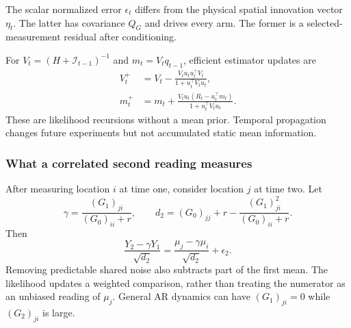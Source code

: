 The scalar normalized error $\epsilon_t$ differs from the physical spatial innovation vector $\eta_t$. The latter has covariance $Q_G$ and drives every arm. The former is a selected-measurement residual after conditioning.

For $V_t=(H+\mathcal I_{t-1})^{-1}$ and $m_t=V_tq_{t-1}$, efficient estimator updates are
\begin{align}
V_t^+&=V_t-\frac{V_tu_tu_t^\top V_t}{1+u_t^\top V_tu_t},\nonumber\\
m_t^+&=m_t+\frac{V_tu_t(R_t-u_t^\top m_t)}{1+u_t^\top V_tu_t}.
\label{spatiotemporal_bandits:eq:update}
\end{align}
These are likelihood recursions without a mean prior. Temporal propagation changes future experiments but not accumulated static mean information.

\subsubsection{What a correlated second reading measures}
After measuring location $i$ at time one, consider location $j$ at time two. Let
\[
\gamma=\frac{(G_1)_{ji}}{(G_0)_{ii}+r},\qquad
d_2=(G_0)_{jj}+r-\frac{(G_1)_{ji}^2}{(G_0)_{ii}+r}.
\]
Then
\[
\frac{Y_2-\gamma Y_1}{\sqrt{d_2}}
=\frac{\mu_j-\gamma\mu_i}{\sqrt{d_2}}+\epsilon_2.
\]
Removing predictable shared noise also subtracts part of the first mean. The likelihood updates a weighted comparison, rather than treating the numerator as an unbiased reading of $\mu_j$. General AR dynamics can have $(G_1)_{ji}=0$ while $(G_2)_{ji}$ is large.

